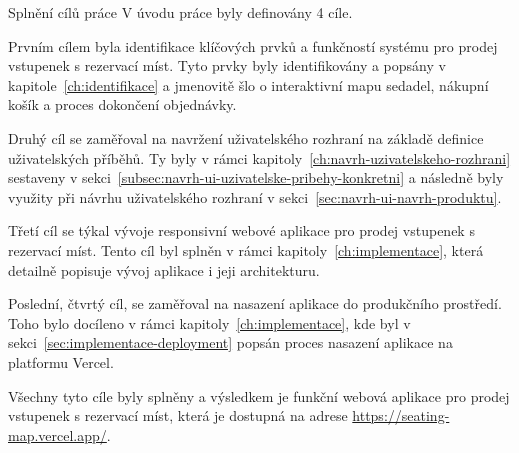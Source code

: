 \begin{section}{Splnění cílů práce}
    \label{sec:zaver-cile}
    V úvodu práce byly definovány 4 cíle.

    Prvním cílem byla identifikace klíčových prvků a funkčností systému pro prodej vstupenek s rezervací míst.
    Tyto prvky byly identifikovány a popsány v kapitole~\ref{ch:identifikace} a jmenovitě šlo o interaktivní mapu sedadel, nákupní košík a proces dokončení objednávky.

    Druhý cíl se zaměřoval na navržení uživatelského rozhraní na základě definice uživatelských příběhů.
    Ty byly v rámci kapitoly~\ref{ch:navrh-uzivatelskeho-rozhrani} sestaveny v sekci~\ref{subsec:navrh-ui-uzivatelske-pribehy-konkretni} a následně byly využity při návrhu uživatelského rozhraní v sekci~\ref{sec:navrh-ui-navrh-produktu}.

    Třetí cíl se týkal vývoje responsivní webové aplikace pro prodej vstupenek s rezervací míst.
    Tento cíl byl splněn v rámci kapitoly~\ref{ch:implementace}, která detailně popisuje vývoj aplikace i jeji architekturu.

    Poslední, čtvrtý cíl, se zaměřoval na nasazení aplikace do produkčního prostředí.
    Toho bylo docíleno v rámci kapitoly~\ref{ch:implementace}, kde byl v sekci~\ref{sec:implementace-deployment} popsán proces nasazení aplikace na platformu Vercel.

    Všechny tyto cíle byly splněny a výsledkem je funkční webová aplikace pro prodej vstupenek s rezervací míst, která je dostupná na adrese \url{https://seating-map.vercel.app/}.
\end{section}

